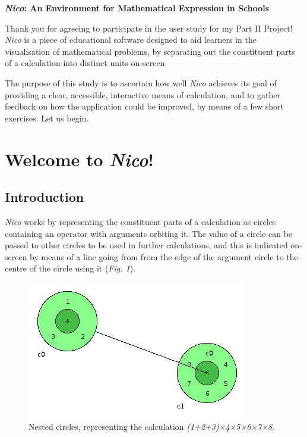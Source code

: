 \documentclass[14pt]{article}
\begin{document}
\begin{center}

{\LARGE {\bf \emph{Nico}: An Environment for Mathematical Expression in Schools}}

\end{center}

Thank you for agreeing to participate in the user study for my Part II Project!
\emph{Nico} is a piece of educational software designed to aid learners in the
visualisation of mathematical problems, by separating out the constituent parts
of a calculation into distinct units on-screen.

The purpose of this study is to ascertain how well \emph{Nico} achieves its goal
of providing a clear, accessible, interactive means of calculation, and to gather
feedback on how the application could be improved, by means of a few short
exercises.  Let us begin.

\section*{Welcome to \emph{Nico}!}

\subsection*{Introduction}

\emph{Nico} works by representing the constituent parts of a calculation as
circles containing an operator with arguments orbiting it.  The value of a circle
can be passed to other circles to be used in further calculations, and this is
indicated on-screen by means of a line going from from the edge of the argument
circle to the centre of the circle using it (\emph{Fig. 1}).

\begin{figure}[htb]
\centering
\includegraphics[scale=0.75]{fig1.png}
\caption{Nested circles, representing the calculation \emph{(1+2+3)×4×5×6×7×8}.}
\end{figure}
\end{document}
